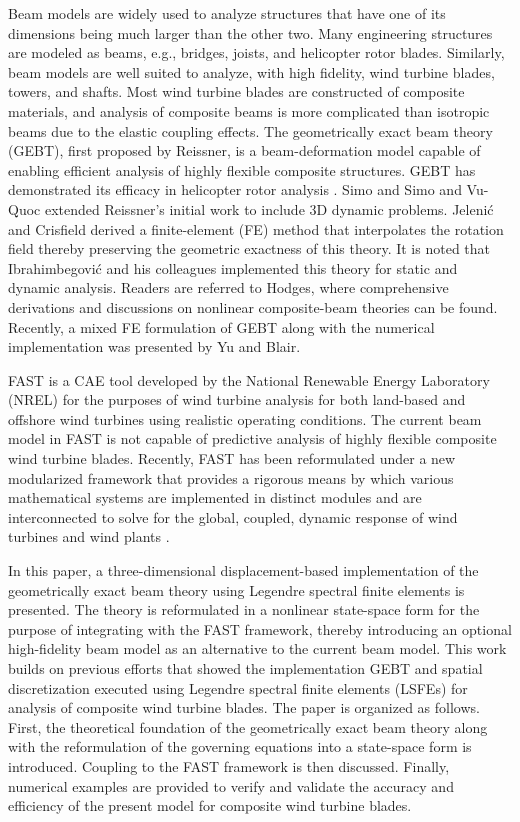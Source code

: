 \documentclass{aiaa-tc}
\begin{document}
Beam models are widely used to analyze structures that have one of its
dimensions being much larger than the other two.  Many engineering
structures are modeled as beams, e.g.,  bridges, joists, and helicopter
rotor blades.  Similarly, beam models are well suited to analyze, with high
fidelity,  wind turbine blades, towers, and shafts.  Most wind turbine
blades are constructed of composite materials, and analysis of composite
beams is more complicated than isotropic beams due to the elastic coupling
effects.  The geometrically exact beam theory (GEBT), first proposed by
Reissner\cite{Ressiner1973}, is a beam-deformation model capable of
enabling efficient analysis of highly flexible composite structures.
GEBT has demonstrated its efficacy in helicopter rotor analysis \cite{Hodges:2007}. 
Simo\cite{Simo1985} and Simo and Vu-Quoc\cite{Simo1986} extended Reissner's
initial work to include 3D dynamic problems. Jeleni\'c and
Crisfield\cite{Crisfield1999} derived a finite-element (FE) method that
interpolates the rotation field thereby preserving the geometric exactness
of this theory. It is noted that Ibrahimbegovi\'c and his colleagues
implemented this theory for static\cite{Ibrahim1995} and
dynamic\cite{Ibrahim1998} analysis. Readers are referred to
Hodges\cite{HodgesBeamBook}, where comprehensive derivations and discussions
on nonlinear composite-beam theories can be found. Recently, a mixed
 FE formulation of GEBT along with the numerical implementation was presented by
Yu and Blair\cite{YuGEBT}.  

FAST is a CAE tool developed by the National Renewable Energy Laboratory
(NREL) for the purposes of wind turbine analysis for both land-based and
offshore wind turbines using realistic operating conditions.  The current
beam model in FAST is not capable of predictive analysis of highly flexible
composite wind turbine blades.
Recently, FAST has been reformulated under a
new modularized framework that provides a rigorous means by which various
mathematical systems are implemented in distinct modules and are interconnected
to solve for the global, coupled, dynamic response of wind turbines and wind
plants \cite{Jonkman:2013,website:FASTModularizationFramework}.

In this paper, a three-dimensional displacement-based
implementation of the geometrically exact beam theory using Legendre
spectral finite elements is presented. The theory is reformulated in a
nonlinear state-space form for the purpose of integrating with the FAST
framework, thereby introducing an optional high-fidelity beam model as an
alternative to the current beam model. This work builds on previous efforts
that showed the implementation GEBT and spatial discretization executed
using Legendre spectral finite elements
(LSFEs)\cite{Wang:GEBT2013,Wang:SFE2013,Wang:GEBT2014,Sprague:FAST2014} for
analysis of composite wind turbine blades. The paper is organized as
follows.  First, the theoretical foundation of the geometrically exact beam
theory along with the reformulation of the governing equations into a
state-space form is introduced. Coupling to the FAST framework is then
discussed. Finally, numerical examples are
provided to verify and validate the accuracy and efficiency of the present model for
composite wind turbine blades. 
\end{document}
